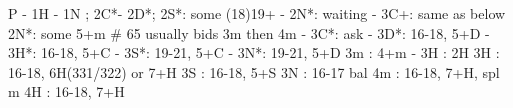 P - 1H - 1N ; 2C*- 2D*; 
2S*: some (18)19+
   - 2N*: waiting
		- 3C+: same as below
2N*: some 5+m  # 65 usually bids 3m then 4m
   - 3C*: ask
		- 3D*: 16-18, 5+D
		- 3H*: 16-18, 5+C
		- 3S*: 19-21, 5+C
		- 3N*: 19-21, 5+D
3m : 4+m
   - 3H : 2H
3H : 16-18, 6H(331/322) or 7+H
3S : 16-18, 5+S
3N : 16-17 bal
4m : 16-18, 7+H, spl m
4H : 16-18, 7+H